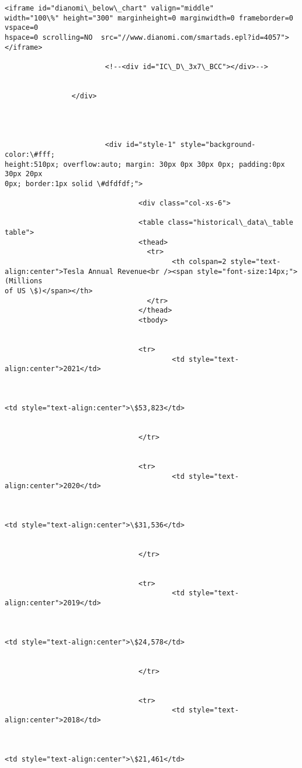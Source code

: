 \documentclass[11pt]{article}
\begin{document}
\begin{Verbatim}[commandchars=\\\{\}]
                        <iframe id="dianomi\_below\_chart" valign="middle"
width="100\%" height="300" marginheight=0 marginwidth=0 frameborder=0 vspace=0
hspace=0 scrolling=NO  src="//www.dianomi.com/smartads.epl?id=4057"></iframe>

                        <!--<div id="IC\_D\_3x7\_BCC"></div>-->


                </div>




                        <div id="style-1" style="background-color:\#fff;
height:510px; overflow:auto; margin: 30px 0px 30px 0px; padding:0px 30px 20px
0px; border:1px solid \#dfdfdf;">

                                <div class="col-xs-6">

                                <table class="historical\_data\_table table">
                                <thead>
                                  <tr>
                                        <th colspan=2 style="text-
align:center">Tesla Annual Revenue<br /><span style="font-size:14px;">(Millions
of US \$)</span></th>
                                  </tr>
                                </thead>
                                <tbody>


                                <tr>
                                        <td style="text-align:center">2021</td>



<td style="text-align:center">\$53,823</td>


                                </tr>


                                <tr>
                                        <td style="text-align:center">2020</td>



<td style="text-align:center">\$31,536</td>


                                </tr>


                                <tr>
                                        <td style="text-align:center">2019</td>



<td style="text-align:center">\$24,578</td>


                                </tr>


                                <tr>
                                        <td style="text-align:center">2018</td>



<td style="text-align:center">\$21,461</td>



\end{Verbatim}
\end{document}
